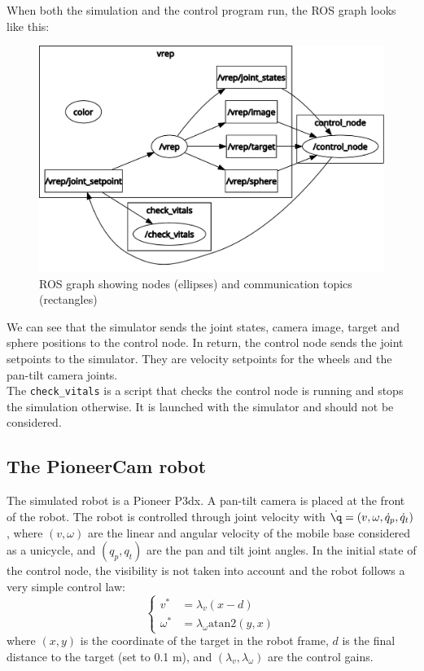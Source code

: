 \documentclass{ecnreport}
\begin{document}
When both the simulation and the control program run, the ROS graph looks like this:

\begin{figure}[h!]\centering
 \includegraphics[width=.6\linewidth]{rosgraph}
 \caption{ROS graph showing nodes (ellipses) and communication topics (rectangles)}
 \label{fig:rosgraph}
\end{figure}

We can see that the simulator sends the joint states, camera image, target and sphere positions to the control node. In return, the control node sends the joint setpoints
to the simulator. They are velocity setpoints for the wheels and the pan-tilt camera joints.\\
The \texttt{check\_vitals} is a script that checks the control node is running and stops the simulation otherwise. It is launched with the simulator and should
not be considered.


\subsection{The PioneerCam robot}

The simulated robot is a Pioneer P3dx. A pan-tilt camera is placed at the front of the robot. The robot is controlled through joint velocity with $\dot \q = (v, \omega, \dot q_p, \dot q_t)$, where $(v,\omega)$ are the linear and angular velocity
of the mobile base considered as a unicycle, and $(q_p, q_t)$ are the pan and tilt joint angles. In the initial state of the control node, the visibility is not taken into account and the robot follows a very simple control law:
\begin{equation}\label{raw}
 \left\{\begin{array}{ll}
         v^* &= \lambda_v(x-d) \\ \omega^* &= \lambda_{\omega}\text{atan2}(y, x)
        \end{array}\right.
\end{equation}where $(x,y)$ is the coordinate of the target in the robot frame, $d$ is the final distance to the target (set to 0.1 m), and $(\lambda_v, \lambda_{\omega})$ are the control gains.\\
\end{document}
